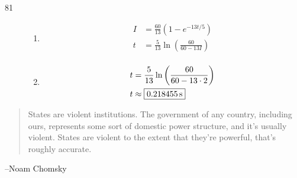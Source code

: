 \documentclass{exam}
\begin{document}
\begin{description}
      \item[81]
        \begin{enumerate}[a]
          \item 
            \begin{align*}
              I &= \frac{60}{13} \left( 1 - e^{-13t/5} \right) \\
              t &= \boxed{\frac{5}{13} \ln \left( \frac{60}{60 - 13I} \right) } \\
            \end{align*}

          \item 
            \begin{align*}
              t &= \frac{5}{13} \ln \left( \frac{60}{60 - 13 \cdot 2} \right)  \\
              t &\approx \boxed{\unit[0.218455]{s}} \\
            \end{align*}

        \end{enumerate}

    \end{description}

  \else
    \vspace{6 cm}
    \begin{quote}
      \begin{em}
        States are violent institutions. The government of any country, including ours, represents some sort of domestic
        power structure, and it's usually violent. States are violent to the extent that they're powerful, that's
        roughly accurate.


      \end{em}
    \end{quote}
    \hspace{1 cm} --Noam Chomsky 
  \fi
\end{document}
